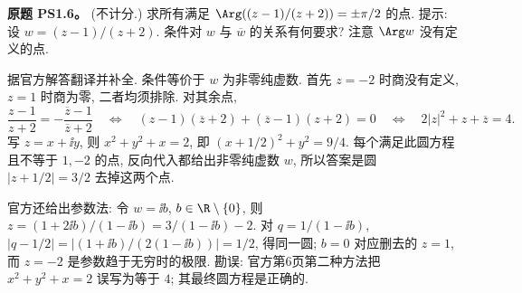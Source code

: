 \begin{exercise}\label{ass:ps1-6}
\textbf{原题 PS1.6。} (不计分.) 求所有满足
$\Arg((z-1)/(z+2))=\pm\pi/2$ 的点.
提示: 设 $w=(z-1)/(z+2)$. 条件对 $w$ 与 $\overline w$ 的关系有何要求? 注意 $\Arg w$ 没有定义的点.
\end{exercise}
\begin{solution}
据官方解答翻译并补全. 条件等价于 $w$ 为非零纯虚数. 首先 $z=-2$ 时商没有定义, $z=1$ 时商为零, 二者均须排除. 对其余点,
\[
 \frac{z-1}{z+2}=-\frac{\overline z-1}{\overline z+2}
 \quad\Longleftrightarrow\quad
 (z-1)(\overline z+2)+(\overline z-1)(z+2)=0
 \quad\Longleftrightarrow\quad
 2|z|^2+z+\overline z=4.
\]
写 $z=x+\ii y$, 则 $x^2+y^2+x=2$, 即
$(x+1/2)^2+y^2=9/4$. 每个满足此圆方程且不等于 $1,-2$ 的点, 反向代入都给出非零纯虚数 $w$, 所以答案是圆 $|z+1/2|=3/2$ 去掉这两个点.

官方还给出参数法: 令 $w=\ii b$, $b\in\R\setminus\{0\}$, 则
$z=(1+2\ii b)/(1-\ii b)=3/(1-\ii b)-2$. 对 $q=1/(1-\ii b)$,
$|q-1/2|=|(1+\ii b)/(2(1-\ii b))|=1/2$, 得同一圆; $b=0$ 对应删去的 $z=1$, 而 $z=-2$ 是参数趋于无穷时的极限.
勘误: 官方第6页第二种方法把 $x^2+y^2+x=2$ 误写为等于 $4$; 其最终圆方程是正确的.
\end{solution}
